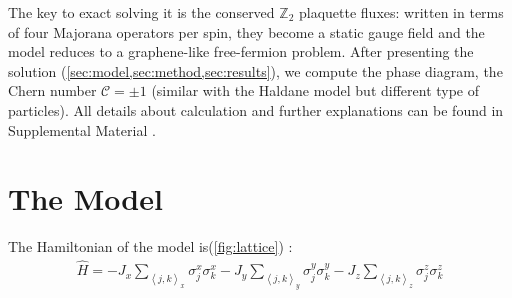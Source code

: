 \documentclass[
  aps,
  prl,
  reprint,
  amsmath,
  amssymb,
  superscriptaddress,
  floatfix
]{revtex4-2}
\newcommand{\mean}[1]{\left\langle #1 \right\rangle}
\newcommand{\osx}{\sigma^x}
\newcommand{\osy}{\sigma^y}
\newcommand{\osz}{\sigma^z}
\begin{document}
The key to exact solving it is the conserved $\mathbb{Z}_2$ plaquette fluxes: written in terms of four Majorana operators per spin, they become a static gauge field and the model reduces to a graphene-like free-fermion problem. 
After presenting the solution (\cref{sec:model,sec:method,sec:results}), we compute the phase diagram, the Chern number $\mathcal{C}=\pm1$ (similar with the Haldane model \cite{Haldane1988} but different type of particles). 
All details about calculation and further explanations can be found in Supplemental Material \cite{SM}.


\section{The Model}
\label{sec:model}
The Hamiltonian of the model is(\cref{fig:lattice}) \cite{Kitaev2006}:
\begin{align}
  \hat H = - J_x \sum_{\mean{j,k}_x} \osx_j \osx_k - J_y \sum_{\mean{j,k}_y} \osy_j \osy_k - J_z \sum_{\mean{j,k}_z} \osz_j \osz_k
\end{align}
\end{document}
